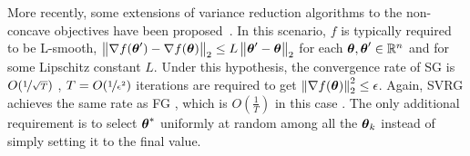 More recently, some extensions of variance reduction algorithms to the non-concave objectives have been proposed~\citep[\eg][]{allen2016variance,reddi2016stochastic,reddi2016fast}. In this scenario, $f$ is typically required to be L-smooth, \ie $\norm[2]{\nabla f(\vtheta') - \nabla f(\vtheta)} \leq L\norm[2]{\vtheta'-\vtheta}$ for each $\vtheta,\vtheta'\in\realspace^n$ and for some Lipschitz constant $L$. Under this hypothesis, the convergence rate of \acs{SG} is $O(\nicefrac{1}{\sqrt{T}})$ \citep{ghadimi2013stochastic}, \ie $T=O(\nicefrac{1}{\epsilon^2})$ iterations are required to get $\norm[2]{\nabla f(\vtheta)}^2\leq\epsilon$. Again, \acs{SVRG} achieves the same rate as \acs{FG} \citep{reddi2016stochastic}, which is $O(\frac{1}{T})$ in this case \citep{nesterov2013introductory}. The only additional requirement is to select $\vtheta^*$ uniformly at random among all the $\vtheta_k$ instead of simply setting it to the final value.
\vspace{-0.05in}
